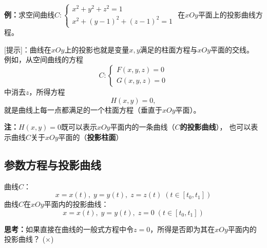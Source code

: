 {\bf 例：}求空间曲线$C:\left\{\begin{array}{l}
	x^2+y^2+z^2=1\\ x^2+(y-1)^2+(z-1)^2=1
\end{array}\right.$
在$xOy$平面上的投影曲线方程。
\begin{center}
\end{center}

[提示]：曲线在$xOy$上的投影也就是变量$x,y$满足的柱面方程与$xOy$平面的交线。
例如，从空间曲线的方程
$$C:\left\{\begin{array}{l}
	F(x,y,z)=0\\ G(x,y,z)=0
\end{array}\right.$$
中消去$z$，所得方程
$$H(x,y)=0,$$
就是曲线上每一点都满足的一个柱面方程（垂直于$xOy$平面）。

{\bf 注：}$H(x,y)=0$既可以表示$xOy$平面内的一条曲线（{\bf $C$的投影曲线}），
也可以表示曲线$C$关于$xOy$平面的（{\bf 投影柱面}）

\subsection{参数方程与投影曲线}

曲线$C$：
$$x=x(t),\;y=y(t),\;z=z(t)\;(t\in[t_0,t_1])$$ 
曲线$C$在$xOy$平面内的投影曲线：
$$x=x(t),\;y=y(t),\;{z=0}\;(t\in[t_0,t_1])$$ 

{\bf 思考：}如果直接在曲线的一般式方程中令$z=0$，所得是否即为其在$xOy$平面内的投影曲线？
(${\times}$)

